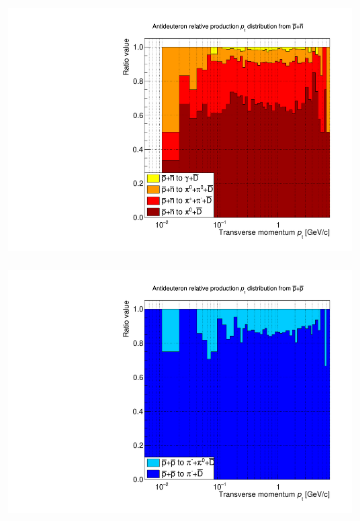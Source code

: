 \begin{figure}[htbp]
    \centering
    \begin{subfigure}{.49\textwidth}
    \centering
        \includegraphics[width=\textwidth]{image/3-risultati/antideuteron_analyse/A/p_n_stack.pdf}
        \caption{}
        \label{fig:A_pn_stack_antideut}
    \end{subfigure}
    \begin{subfigure}{.49\textwidth}
        \centering
        \includegraphics[width=\textwidth]{image/3-risultati/antideuteron_analyse/A/p_p_stack.pdf}
        \caption{}
        \label{fig:A_pp_stack_antideut}
    \end{subfigure}
    \begin{subfigure}{.49\textwidth}

\end{subfigure}
\end{figure}
